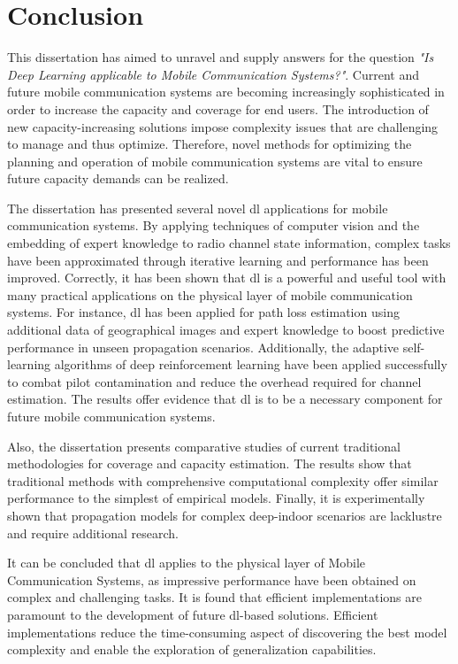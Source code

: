 \chapter{Conclusion}\label{ch:conclusion}

This dissertation has aimed to unravel and supply answers for the question \emph{"Is Deep Learning applicable to Mobile Communication Systems?"}. Current and future mobile communication systems are becoming increasingly sophisticated in order to increase the capacity and coverage for end users. The introduction of new capacity-increasing solutions impose complexity issues that are challenging to manage and thus optimize. Therefore, novel methods for optimizing the planning and operation of mobile communication systems are vital to ensure future capacity demands can be realized.

The dissertation has presented several novel \acrlong{dl} applications for mobile communication systems. By applying techniques of computer vision and the embedding of expert knowledge to radio channel state information, complex tasks have been approximated through iterative learning and performance has been improved. Correctly, it has been shown that \acrlong{dl} is a powerful and useful tool with many practical applications on the physical layer of mobile communication systems. For instance, \acrlong{dl} has been applied for path loss estimation using additional data of geographical images and expert knowledge to boost predictive performance in unseen propagation scenarios. Additionally, the adaptive self-learning algorithms of deep reinforcement learning have been applied successfully to combat pilot contamination and reduce the overhead required for channel estimation. The results offer evidence that \acrlong{dl} is to be a necessary component for future mobile communication systems.

Also, the dissertation presents comparative studies of current traditional methodologies for coverage and capacity estimation. The results show that traditional methods with comprehensive computational complexity offer similar performance to the simplest of empirical models. Finally, it is experimentally shown that propagation models for complex deep-indoor scenarios are lacklustre and require additional research.

It can be concluded that \acrlong{dl} applies to the physical layer of Mobile Communication Systems, as impressive performance have been obtained on complex and challenging tasks. It is found that efficient implementations are paramount to the development of future \acrlong{dl}-based solutions. Efficient implementations reduce the time-consuming aspect of discovering the best model complexity and enable the exploration of generalization capabilities. 

